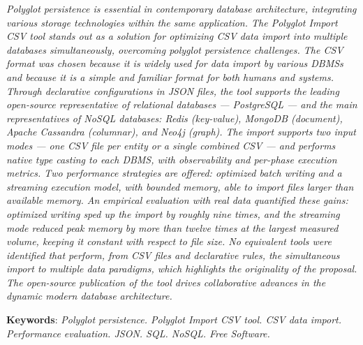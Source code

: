\documentclass[
  12pt,
  oneside,
  a4paper,
  chapter=TITLE,
  section=TITLE,
  english,
  brazil,
]{abntex2}
\begin{document}
\begin{resumo}

  \rmfamily\itshape
  Polyglot persistence is essential in contemporary database architecture, integrating
  various storage technologies within the same application. The \textit{Polyglot Import CSV}
  tool stands out as a solution for optimizing CSV data import into multiple databases
  simultaneously, overcoming polyglot persistence challenges. The CSV format was chosen
  because it is widely used for data import by various DBMSs and because it is a simple
  and familiar format for both humans and systems. Through declarative configurations in
  JSON files, the tool supports the leading open-source representative of relational
  databases --- PostgreSQL --- and the main representatives of NoSQL databases: Redis
  (key-value), MongoDB (document), Apache Cassandra (columnar), and Neo4j (graph). The
  import supports two input modes --- one CSV file per entity or a single combined CSV ---
  and performs native type casting to each DBMS, with observability and per-phase execution
  metrics. Two performance strategies are offered: optimized batch writing and a streaming
  execution model, with bounded memory, able to import files larger than available memory.
  An empirical evaluation with real data quantified these gains: optimized writing sped up
  the import by roughly nine times, and the streaming mode reduced peak memory by more than
  twelve times at the largest measured volume, keeping it constant with respect to file
  size. No equivalent tools were identified that perform, from CSV files and declarative
  rules, the simultaneous import to multiple data paradigms, which highlights the
  originality of the proposal. The open-source publication of the tool drives collaborative
  advances in the dynamic modern database architecture.

  \vspace{\onelineskip}

  \noindent
  {\rmfamily\upshape\textbf{Keywords}}: \textit{Polyglot persistence.
  Polyglot Import CSV tool. CSV data import. Performance evaluation. JSON. SQL. NoSQL.
  Free Software.}
\end{resumo}


\listoffigures*
\cleardoublepage

\listoftables*
\cleardoublepage
\end{document}
